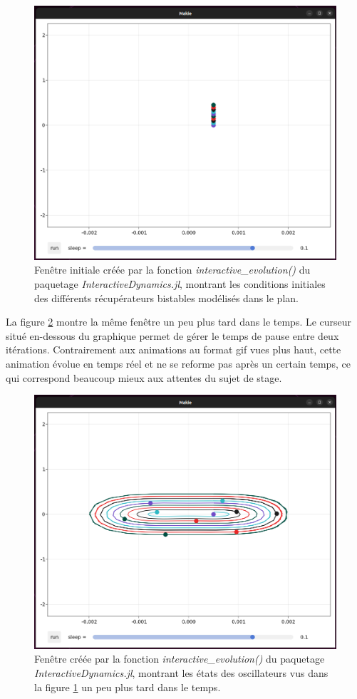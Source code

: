 \documentclass[a4paper, french, 12pt, titlepage]{article}
\begin{document}
\begin{figure}[H]
  \begin{center}
    \includegraphics[width=0.8\linewidth]{interactiveevolution_0.png}
    \caption{Fenêtre initiale créée par la fonction \emph{interactive\_evolution()} du paquetage \emph{InteractiveDynamics.jl}, montrant les conditions initiales des différents récupérateurs bistables modélisés dans le plan.}
    \label{fig:fig9}
  \end{center}
\end{figure}

La figure \ref{fig:fig10} montre la même fenêtre un peu plus tard dans le temps.
Le curseur situé en-dessous du graphique permet de gérer le temps de pause entre deux itérations. 
Contrairement aux animations au format gif vues plus haut, cette animation évolue en temps réel et ne se reforme pas après un certain temps, ce qui correspond beaucoup mieux aux attentes du sujet de stage.

\begin{figure}[H]
  \begin{center}
    \includegraphics[width=0.8\linewidth]{interactiveevolution_1.png}
    \caption{Fenêtre créée par la fonction \emph{interactive\_evolution()} du paquetage \emph{InteractiveDynamics.jl}, montrant les états des oscillateurs vus dans la figure \ref{fig:fig9} un peu plus tard dans le temps.}
    \label{fig:fig10}
  \end{center}
\end{figure}
\end{document}
